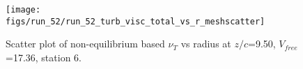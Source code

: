 \begin{figure}[H]
\centering
\texttt{[image: figs/run\_52/run\_52\_turb\_visc\_total\_vs\_r\_meshscatter]}
\caption{Scatter plot of non-equilibrium based $\nu_T$ vs radius at $z/c$=9.50, $V_{free}$=17.36, station 6.}
\label{fig:run_52_turb_visc_total_vs_r_meshscatter}
\end{figure}



